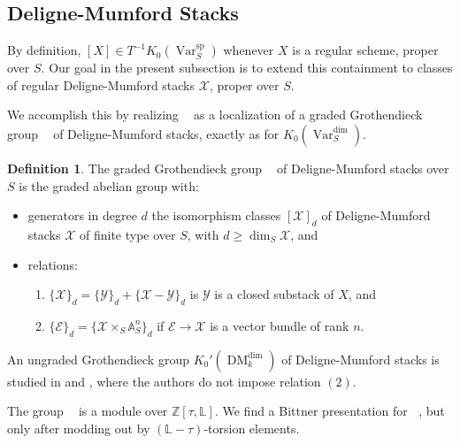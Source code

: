 \documentclass{amsart}
\theoremstyle{definition}
\newtheorem{defn}[thm]{Definition}
\DeclareMathOperator{\Var}{Var}
\DeclareMathOperator{\spr}{sp}
\DeclareMathOperator{\DM}{DM}
\DeclareMathOperator{\Stk}{Stk}
\newcommand{\KdimS}{K_0(\Var_S^{\dim})}
\newcommand{\KsprS}{K_0(\Var_S^{\spr})}
\DeclareMathOperator{\KstkS}{K_0(\Stk_S^{\dim})}
\DeclareMathOperator{\KdmS}{K_0(\DM_S^{\dim})}
\numberwithin{equation}{section}
\begin{document}
\subsection{Deligne-Mumford Stacks}\label{DM section}
By definition, $[X] \in T^{-1} \KsprS$ whenever $X$ is a regular scheme, proper over $S$. Our goal in the present subsection is to extend this containment to classes of regular Deligne-Mumford stacks $\mathscr{X}$, proper over $S$.

We accomplish this by realizing $\KstkS$ as a localization of a graded Grothendieck group $\KdmS$ of Deligne-Mumford stacks, exactly as for $\KdimS$.

\begin{defn}\label{K0DM defn}
The graded Grothendieck group $\KdmS$ of Deligne-Mumford stacks over $S$ is the graded abelian group with:
\begin{itemize}
    \item generators in degree $d$ the isomorphism classes $[\mathscr{X}]_d$ of Deligne-Mumford stacks $\mathscr{X}$ of finite type over $S$, with $d \geq \dim_S \mathscr{X}$, and
    \item relations:
        \begin{enumerate}
            \item $\{ \mathscr{X} \}_d = \{ \mathscr{Y} \}_d + \{ \mathscr{X}-\mathscr{Y} \}_d$ is $\mathscr{Y}$ is a closed substack of $X$, and
            \item $\{ \mathscr{E} \}_d = \{ \mathscr{X} \times_S \mathbb{A}^n_S \}_d$ if $\mathscr{E} \rightarrow \mathscr{X}$ is a vector bundle of rank $n$.
        \end{enumerate}
\end{itemize}
\end{defn}
An ungraded Grothendieck group $K_0'(\DM_k^{\dim})$ of Deligne-Mumford stacks is studied in \cite{berghK0} and \cite{bgll}, where the authors do not impose relation $(2)$.

The group $\KdmS$ is a module over $\mathbb{Z}[\tau, \mathbb{L}]$. We find a Bittner presentation for $\KdmS$, but only after modding out by $(\mathbb{L}-\tau)$-torsion elements.
\end{document}
